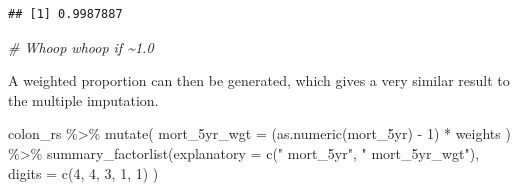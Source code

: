 \documentclass[
]{book}
\newenvironment{Shaded}{\begin{snugshade}}{\end{snugshade}}
\newcommand{\AttributeTok}[1]{\textcolor[rgb]{0.77,0.63,0.00}{#1}}
\newcommand{\CommentTok}[1]{\textcolor[rgb]{0.56,0.35,0.01}{\textit{#1}}}
\newcommand{\DecValTok}[1]{\textcolor[rgb]{0.00,0.00,0.81}{#1}}
\newcommand{\FunctionTok}[1]{\textcolor[rgb]{0.00,0.00,0.00}{#1}}
\newcommand{\NormalTok}[1]{#1}
\newcommand{\OtherTok}[1]{\textcolor[rgb]{0.56,0.35,0.01}{#1}}
\newcommand{\SpecialCharTok}[1]{\textcolor[rgb]{0.00,0.00,0.00}{#1}}
\newcommand{\StringTok}[1]{\textcolor[rgb]{0.31,0.60,0.02}{#1}}
\begin{document}
\begin{Shaded}
\end{Shaded}

\begin{verbatim}
## [1] 0.9987887
\end{verbatim}

\begin{Shaded}
\begin{Highlighting}[]
\CommentTok{\# Whoop whoop if \textasciitilde{}1.0}
\end{Highlighting}
\end{Shaded}

A weighted proportion can then be generated, which gives a very similar result to the multiple imputation.

\begin{Shaded}
\begin{Highlighting}[]
\NormalTok{colon\_rs }\SpecialCharTok{\%\textgreater{}\%}  
  \FunctionTok{mutate}\NormalTok{(}
    \AttributeTok{mort\_5yr\_wgt =}\NormalTok{ (}\FunctionTok{as.numeric}\NormalTok{(mort\_5yr) }\SpecialCharTok{{-}} \DecValTok{1}\NormalTok{) }\SpecialCharTok{*}\NormalTok{ weights}
\NormalTok{  ) }\SpecialCharTok{\%\textgreater{}\%} 
  \FunctionTok{summary\_factorlist}\NormalTok{(}\AttributeTok{explanatory =} \FunctionTok{c}\NormalTok{(}\StringTok{" mort\_5yr"}\NormalTok{, }\StringTok{" mort\_5yr\_wgt"}\NormalTok{), }\AttributeTok{digits =} \FunctionTok{c}\NormalTok{(}\DecValTok{4}\NormalTok{, }\DecValTok{4}\NormalTok{, }\DecValTok{3}\NormalTok{, }\DecValTok{1}\NormalTok{, }\DecValTok{1}\NormalTok{) )}
\end{Highlighting}
\end{Shaded}
\end{document}

